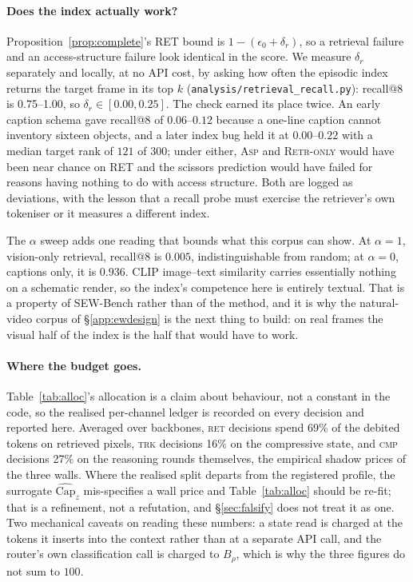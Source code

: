 \documentclass[10pt]{article}
\newcommand{\VsplitRETBr}{69}
\newcommand{\VsplitTRKBs}{16}
\newcommand{\VsplitCMPBc}{27}
\newcommand{\VrecallMin}{0.75}
\newcommand{\VrecallMax}{1.00}
\newcommand{\VdeltaRMin}{0.00}
\newcommand{\VdeltaRMax}{0.25}
\theoremstyle{definition}
\theoremstyle{plain}
\newcommand{\ASP}{\textsc{Asp}}
\renewcommand{\Cap}{\mathrm{Cap}}
\begin{document}
\paragraph{Does the index actually work?} Proposition~\ref{prop:complete}'s RET bound is
$1-(\epsilon_0+\delta_r)$, so a retrieval failure and an access-structure failure look identical
in the score. We measure $\delta_r$ separately and locally, at no API cost, by asking how often
the episodic index returns the target frame in its top $k$
(\texttt{analysis/\allowbreak retrieval\_\allowbreak recall.py}): recall@$8$ is
\VrecallMin{}--\VrecallMax{}, so $\delta_r\in[\VdeltaRMin{},\VdeltaRMax{}]$. The check earned
its place twice. An early caption schema gave recall@$8$ of $0.06$--$0.12$ because a one-line
caption cannot inventory sixteen objects, and a later index bug held it at $0.00$--$0.22$ with a
median target rank of $121$ of $300$; under either, \ASP{} and \textsc{Retr-only} would have
been near chance on RET and the scissors prediction would have failed for reasons having nothing
to do with access structure. Both are logged as deviations, with the lesson that a recall probe
must exercise the retriever's own tokeniser or it measures a different index.

The $\alpha$ sweep adds one reading that bounds what this corpus can show. At $\alpha{=}1$,
vision-only retrieval, recall@$8$ is $0.005$, indistinguishable from random; at $\alpha{=}0$,
captions only, it is $0.936$. CLIP image--text similarity carries essentially nothing on a
schematic render, so the index's competence here is entirely textual. That is a property of
SEW-Bench rather than of the method, and it is why the natural-video corpus of
\S\ref{app:ewdesign} is the next thing to build: on real frames the visual half of the index is
the half that would have to work.

\paragraph{Where the budget goes.} Table~\ref{tab:alloc}'s allocation is a claim about behaviour, not a constant in the code, so the realised per-channel ledger is recorded on every decision and reported here. Averaged over backbones, \textsc{ret} decisions spend \VsplitRETBr{}\% of the debited tokens on retrieved pixels, \textsc{trk} decisions \VsplitTRKBs{}\% on the compressive state, and \textsc{cmp} decisions \VsplitCMPBc{}\% on the reasoning rounds themselves, the empirical shadow prices of the three walls. Where the realised split departs from the registered profile, the surrogate $\widehat{\Cap}_z$ mis-specifies a wall price and Table~\ref{tab:alloc} should be re-fit; that is a refinement, not a refutation, and \S\ref{sec:falsify} does not treat it as one. Two mechanical caveats on reading these numbers: a state read is charged at the tokens it inserts into the context rather than at a separate API call, and the router's own classification call is charged to $B_\rho$, which is why the three figures do not sum to $100$.
\end{document}
